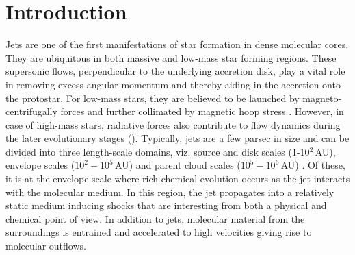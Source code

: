 \documentclass[useAMS,usenatbib]{mn2e}
\begin{document}
%
%


\section{Introduction}
Jets are one of the first manifestations of star
formation in dense molecular cores. They are ubiquitous in both
massive and low-mass star forming regions. These supersonic flows,
perpendicular to the underlying accretion disk, play a vital role in
removing excess angular momentum and thereby aiding in the accretion onto the protostar. 
For low-mass stars, they are believed to be launched by magneto-centrifugally forces and
further collimated by magnetic hoop stress
\citep[][]{Blandford:1982p892, Konigl:2000p607}. However, in case of
high-mass stars, radiative forces also contribute to flow dynamics
during the later evolutionary stages (\citealt{Vaidya:2011p8992}). 
Typically, jets are a few parsec in size and can be divided into
three length-scale domains, viz. source and disk scales (1-10$^{2}\,$AU),
envelope scales ($10^{2} - 10^{5}$\,AU) and parent cloud scales
($10^{5} - 10^{6}$\,AU) \citep[e.g.,][and references therein]{Ray:2007p3306}.
Of these, it is at the envelope scale where rich
chemical evolution occurs as the jet interacts
with the molecular medium. In this region, the jet propagates into a
relatively static medium inducing shocks that are interesting from both a
physical and chemical point of view. In addition to jets, molecular
material from the surroundings is entrained and accelerated to high
velocities giving rise to molecular outflows.
%
\end{document}
